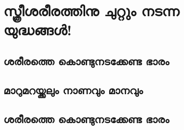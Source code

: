 \chapter{സ്ത്രീശരീരത്തിനു ചുറ്റും നടന്ന യുദ്ധങ്ങൾ!}
\label{chapter7}
\section{ശരീരത്തെ കൊണ്ടുനടക്കേണ്ട ഭാരം}
\label{ch7sec1}
\section{മാറുമറയ്ക്കലും നാണവും മാനവും}
\section{ശരീരത്തെ കൊണ്ടുനടക്കേണ്ട ഭാരം}
\label{ch7sec2}
